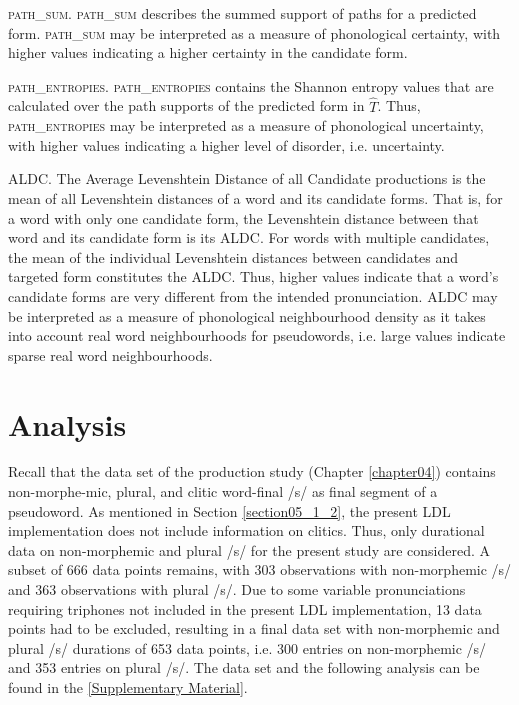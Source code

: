 \textsc{path\_sum}. \textsc{path\_sum} describes the summed support of paths for a predicted form. \textsc{path\_sum} may be interpreted as a measure of phonological certainty, with higher values indicating a higher certainty in the candidate form.

\textsc{path\_entropies}. \textsc{path\_entropies} contains the Shannon entropy values that are calculated over the path supports of the predicted form in $\hat{T}$. Thus, \textsc{path\_entropies} may be interpreted as a measure of phonological uncertainty, with higher values indicating a higher level of disorder, i.e. uncertainty.

\textsc{ALDC}. The Average Levenshtein Distance of all Candidate productions is the mean of all Levenshtein distances of a word and its candidate forms. That is, for a word with only one candidate form, the Levenshtein distance between that word and its candidate form is its \textsc{ALDC}. For words with multiple candidates, the mean of the individual Levenshtein distances between candidates and targeted form constitutes the \textsc{ALDC}. Thus, higher values indicate that a word’s candidate forms are very different from the intended pronunciation. \textsc{ALDC} may be interpreted as a measure of phonological neighbourhood density as it takes into account real word neighbourhoods for pseudowords, i.e. large values indicate sparse real word neighbourhoods.

\section{Analysis}\label{section05_2}

Recall that the data set of the production study (Chapter \ref{chapter04}) contains non-morphe-mic, plural, and clitic word-final /s/ as final segment of a pseudoword. As mentioned in Section \ref{section05_1_2}, the present LDL implementation does not include information on clitics. Thus, only durational data on non-morphemic and plural /s/ for the present study are considered. A subset of 666 data points remains, with 303 observations with non-morphemic /s/ and 363 observations with plural /s/. Due to some variable pronunciations requiring triphones not included in the present LDL implementation, 13 data points had to be excluded, resulting in a final data set with non-morphemic and plural /s/ durations of 653 data points, i.e. 300 entries on non-morphemic /s/ and 353 entries on plural /s/. The data set and the following analysis can be found in the \ref{Supplementary Material}.

